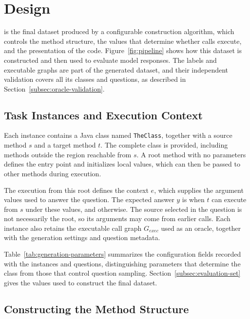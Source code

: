 \section{\benchmark Design}
\label{sec:benchmark-design}

\benchmark is the final dataset produced by a configurable construction algorithm, which controls the method structure, the values that determine whether calls execute, and the presentation of the code. Figure~\ref{fig:pipeline} shows how this dataset is constructed and then used to evaluate model responses. The labels and executable graphs are part of the generated dataset, and their independent validation covers all its classes and questions, as described in Section~\ref{subsec:oracle-validation}.



\subsection{Task Instances and Execution Context}

Each instance contains a Java class named \texttt{TheClass}, together with a source method $s$ and a target method $t$. The complete class is provided, including methods outside the region reachable from $s$. A root method with no parameters defines the entry point and initializes local values, which can then be passed to other methods during execution.

The execution from this root defines the context $e$, which supplies the argument values used to answer the question. The expected answer $y$ is \true{} when $t$ can execute from $s$ under these values, and \false{} otherwise. The source selected in the question is not necessarily the root, so its arguments may come from earlier calls. Each instance also retains the executable call graph $G_{\mathit{exec}}$ used as an oracle, together with the generation settings and question metadata.

Table~\ref{tab:generation-parameters} summarizes the configuration fields recorded with the instances and questions, distinguishing parameters that determine the class from those that control question sampling. Section~\ref{subsec:evaluation-set} gives the values used to construct the final dataset.



\subsection{Constructing the Method Structure}

